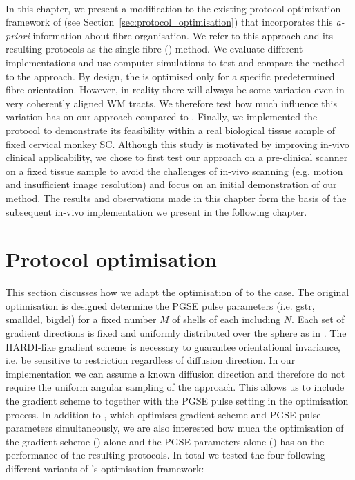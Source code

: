 \paragraph{}
In this chapter, we present a modification to the existing protocol optimization framework of \cite{Alexander:2008} (see Section~\ref{sec:protocol_optimisation}) that incorporates this \textit{a-priori} information about fibre organisation. We refer to this approach and its resulting protocols as the single-fibre ({\SF}) method. We evaluate different {\SF} implementations and use computer simulations to test and compare the \SF method to the {\OI} approach. By design, the {\SF} is optimised only for a specific predetermined fibre orientation. However, in reality there will always be some variation even in very coherently aligned \gls{WM} tracts. We therefore test how much influence this variation has on our {\SF} approach compared to {\OI}. Finally, we implemented the {\SF} protocol to demonstrate its feasibility within a real biological tissue sample of fixed cervical monkey \gls{SC}. Although this study is motivated by improving in-vivo clinical applicability, we chose to first test our approach on a pre-clinical scanner on a fixed tissue sample to avoid the challenges of in-vivo scanning (e.g. motion and insufficient image resolution) and focus on an initial demonstration of our method. The results and observations made in this chapter form the basis of the subsequent in-vivo implementation we present in the following chapter.

\section{Protocol optimisation}
This section discusses how we adapt the {\OI} optimisation of \citet{Alexander:2008} to the {\SF} case. The original {\OI} optimisation is designed determine the PGSE pulse parameters (i.e. \gls{gstr}, \gls{smalldel}, \gls{bigdel}) for a fixed number $M$ of shells of each including $N$. Each set of gradient directions is fixed and uniformly distributed over the sphere as in \citep{Cook:2007}. The HARDI-like gradient scheme is necessary to guarantee orientational invariance, i.e. be sensitive to restriction regardless of diffusion direction. In our {\SF} implementation we can assume a known diffusion direction and therefore do not require the uniform angular sampling of the {\OI} approach. This allows us to include the gradient scheme to together with the PGSE pulse setting in the optimisation process. In addition to {\SF}, which optimises gradient scheme and PGSE pulse parameters simultaneously, we are also interested how much the optimisation of the gradient scheme ({\DO}) alone and the PGSE parameters alone ({\SD}) has on the performance of the resulting protocols. In total we tested the four following different variants of \citet{Alexander:2008}'s optimisation framework:

